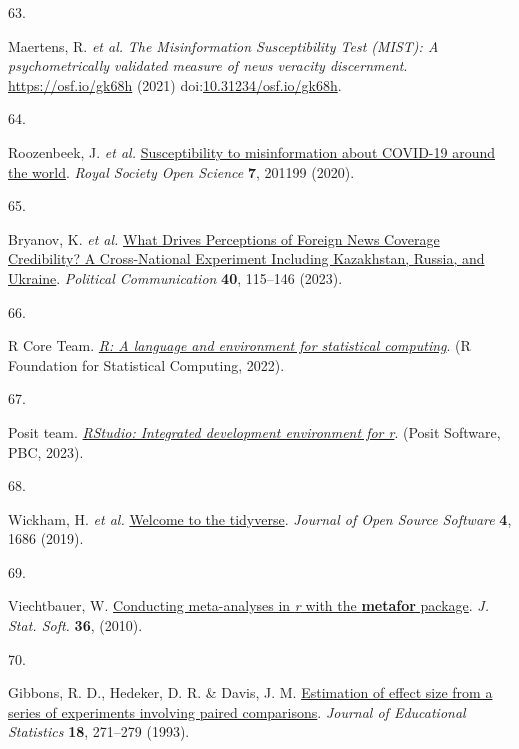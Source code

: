 \documentclass[
  man]{apa6}
\newlength{\cslhangindent}
\newlength{\csllabelwidth}
\newenvironment{CSLReferences}[2] %
 {\begin{list}{}{%
  \setlength{\itemindent}{0pt}
  \setlength{\leftmargin}{0pt}
  \setlength{\parsep}{0pt}
  \ifodd #1
   \setlength{\leftmargin}{\cslhangindent}
   \setlength{\itemindent}{-1\cslhangindent}
  \fi
  \setlength{\itemsep}{#2\baselineskip}}}
 {\end{list}}
\newcommand{\CSLLeftMargin}[1]{\parbox[t]{\csllabelwidth}{\strut#1\strut}}
\newcommand{\CSLRightInline}[1]{\parbox[t]{\linewidth - \csllabelwidth}{\strut#1\strut}}
\begin{document}
\begin{CSLReferences}{0}{0}
\CSLLeftMargin{63. }%
\CSLRightInline{*Maertens, R. \emph{et al.} \emph{The Misinformation Susceptibility Test (MIST): A psychometrically validated measure of news veracity discernment}. \url{https://osf.io/gk68h} (2021) doi:\href{https://doi.org/10.31234/osf.io/gk68h}{10.31234/osf.io/gk68h}.}

\CSLLeftMargin{64. }%
\CSLRightInline{*Roozenbeek, J. \emph{et al.} \href{https://doi.org/10.1098/rsos.201199}{Susceptibility to misinformation about COVID-19 around the world}. \emph{Royal Society Open Science} \textbf{7}, 201199 (2020).}

\CSLLeftMargin{65. }%
\CSLRightInline{*Bryanov, K. \emph{et al.} \href{https://doi.org/10.1080/10584609.2023.2172492}{What Drives Perceptions of Foreign News Coverage Credibility? A Cross-National Experiment Including Kazakhstan, Russia, and Ukraine}. \emph{Political Communication} \textbf{40}, 115--146 (2023).}

\CSLLeftMargin{66. }%
\CSLRightInline{R Core Team. \emph{\href{https://www.R-project.org/}{R: A language and environment for statistical computing}}. (R Foundation for Statistical Computing, 2022).}

\CSLLeftMargin{67. }%
\CSLRightInline{Posit team. \emph{\href{http://www.posit.co/}{RStudio: Integrated development environment for r}}. (Posit Software, PBC, 2023).}

\CSLLeftMargin{68. }%
\CSLRightInline{Wickham, H. \emph{et al.} \href{https://doi.org/10.21105/joss.01686}{Welcome to the tidyverse}. \emph{Journal of Open Source Software} \textbf{4}, 1686 (2019).}

\CSLLeftMargin{69. }%
\CSLRightInline{Viechtbauer, W. \href{https://doi.org/10.18637/jss.v036.i03}{Conducting meta-analyses in \emph{r} with the \textbf{metafor} package}. \emph{J. Stat. Soft.} \textbf{36}, (2010).}

\CSLLeftMargin{70. }%
\CSLRightInline{Gibbons, R. D., Hedeker, D. R. \& Davis, J. M. \href{https://doi.org/10.3102/10769986018003271}{Estimation of effect size from a series of experiments involving paired comparisons}. \emph{Journal of Educational Statistics} \textbf{18}, 271--279 (1993).}


\end{CSLReferences}
\end{document}
